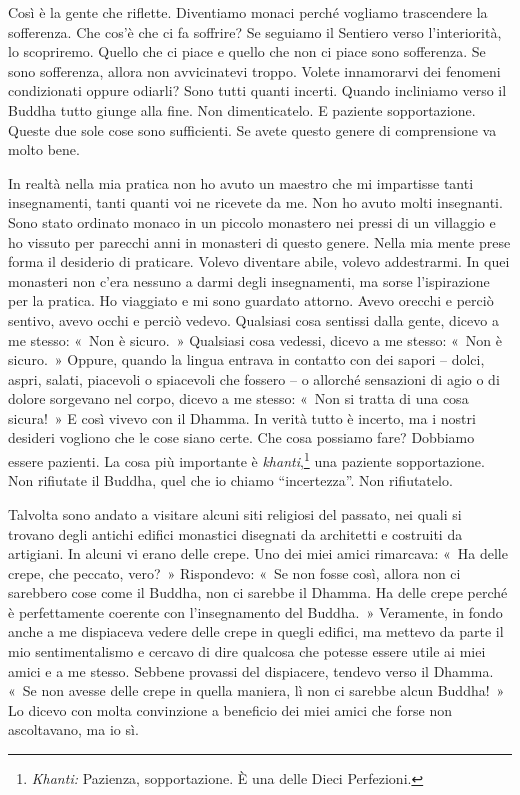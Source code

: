 Così è la gente che riflette. Diventiamo monaci perché vogliamo
trascendere la sofferenza. Che cos'è che ci fa soffrire? Se seguiamo il
Sentiero verso l'interiorità, lo scopriremo. Quello che ci piace e
quello che non ci piace sono sofferenza. Se sono sofferenza, allora non
avvicinatevi troppo. Volete innamorarvi dei fenomeni condizionati oppure
odiarli? Sono tutti quanti incerti. Quando incliniamo verso il Buddha
tutto giunge alla fine. Non dimenticatelo. E paziente sopportazione.
Queste due sole cose sono sufficienti. Se avete questo genere di
comprensione va molto bene.

In realtà nella mia pratica non ho avuto un maestro che mi impartisse
tanti insegnamenti, tanti quanti voi ne ricevete da me. Non ho avuto
molti insegnanti. Sono stato ordinato monaco in un piccolo monastero nei
pressi di un villaggio e ho vissuto per parecchi anni in monasteri di
questo genere. Nella mia mente prese forma il desiderio di praticare.
Volevo diventare abile, volevo addestrarmi. In quei monasteri non c'era
nessuno a darmi degli insegnamenti, ma sorse l'ispirazione per la
pratica. Ho viaggiato e mi sono guardato attorno. Avevo orecchi e perciò
sentivo, avevo occhi e perciò vedevo. Qualsiasi cosa sentissi dalla
gente, dicevo a me stesso: «~Non è sicuro.~» Qualsiasi cosa vedessi,
dicevo a me stesso: «~Non è sicuro.~» Oppure, quando la lingua entrava
in contatto con dei sapori -- dolci, aspri, salati, piacevoli o
spiacevoli che fossero -- o allorché sensazioni di agio o di dolore
sorgevano nel corpo, dicevo a me stesso: «~Non si tratta di una cosa
sicura!~» E così vivevo con il Dhamma. In verità tutto è incerto, ma i
nostri desideri vogliono che le cose siano certe. Che cosa possiamo
fare? Dobbiamo essere pazienti. La cosa più importante è
\emph{khanti},\footnote{\emph{Khanti:} Pazienza, sopportazione. È una
  delle Dieci Perfezioni.} una paziente sopportazione. Non rifiutate il
Buddha, quel che io chiamo ``incertezza''. Non rifiutatelo.

Talvolta sono andato a visitare alcuni siti religiosi del passato, nei
quali si trovano degli antichi edifici monastici disegnati da architetti
e costruiti da artigiani. In alcuni vi erano delle crepe. Uno dei miei
amici rimarcava: «~Ha delle crepe, che peccato, vero?~» Rispondevo: «~Se
non fosse così, allora non ci sarebbero cose come il Buddha, non ci
sarebbe il Dhamma. Ha delle crepe perché è perfettamente coerente con
l'insegnamento del Buddha.~» Veramente, in fondo anche a me dispiaceva
vedere delle crepe in quegli edifici, ma mettevo da parte il mio
sentimentalismo e cercavo di dire qualcosa che potesse essere utile ai
miei amici e a me stesso. Sebbene provassi del dispiacere, tendevo verso
il Dhamma. «~Se non avesse delle crepe in quella maniera, lì non ci
sarebbe alcun Buddha!~» Lo dicevo con molta convinzione a beneficio dei
miei amici che forse non ascoltavano, ma io sì.

